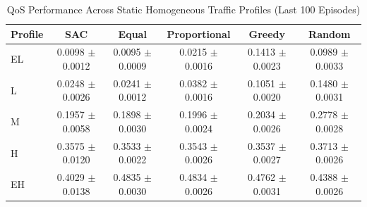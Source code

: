 \begin{table}[!t]
\centering
\caption{QoS Performance Across Static Homogeneous Traffic Profiles (Last 100 Episodes)}
\label{tab:static_homogeneous_comparison}
\begin{tabular}{lccccc}
\toprule
\textbf{Profile} & \textbf{SAC} & \textbf{Equal} & \textbf{Proportional} & \textbf{Greedy} & \textbf{Random} \\
\midrule
EL & 0.0098 $\pm$ 0.0012 & 0.0095 $\pm$ 0.0009 & 0.0215 $\pm$ 0.0016 & 0.1413 $\pm$ 0.0023 & 0.0989 $\pm$ 0.0033 \\
L & 0.0248 $\pm$ 0.0026 & 0.0241 $\pm$ 0.0012 & 0.0382 $\pm$ 0.0016 & 0.1051 $\pm$ 0.0020 & 0.1480 $\pm$ 0.0031 \\
M & 0.1957 $\pm$ 0.0058 & 0.1898 $\pm$ 0.0030 & 0.1996 $\pm$ 0.0024 & 0.2034 $\pm$ 0.0026 & 0.2778 $\pm$ 0.0028 \\
H & 0.3575 $\pm$ 0.0120 & 0.3533 $\pm$ 0.0022 & 0.3543 $\pm$ 0.0026 & 0.3537 $\pm$ 0.0027 & 0.3713 $\pm$ 0.0026 \\
EH & 0.4029 $\pm$ 0.0138 & 0.4835 $\pm$ 0.0030 & 0.4834 $\pm$ 0.0026 & 0.4762 $\pm$ 0.0031 & 0.4388 $\pm$ 0.0026 \\
\bottomrule
\end{tabular}
\end{table}
